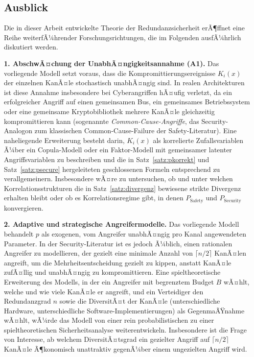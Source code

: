 ﻿\documentclass[a4paper,12pt]{article}
\theoremstyle{definition}
\begin{document}
\subsection{Ausblick}

Die in dieser Arbeit entwickelte Theorie der Redundanzsicherheit erÃ¶ffnet eine Reihe weiterfÃ¼hrender Forschungsrichtungen, die im Folgenden ausfÃ¼hrlich diskutiert werden.

\textbf{1. AbschwÃ¤chung der UnabhÃ¤ngigkeitsannahme (A1).} Das vorliegende Modell setzt voraus, dass die Kompromittierungsereignisse $K_i(x)$ der einzelnen KanÃ¤le stochastisch unabhÃ¤ngig sind. In realen Architekturen ist diese Annahme insbesondere bei Cyberangriffen hÃ¤ufig verletzt, da ein erfolgreicher Angriff auf einen gemeinsamen Bus, ein gemeinsames Betriebssystem oder eine gemeinsame Kryptobibliothek mehrere KanÃ¤le gleichzeitig kompromittieren kann (sogenannte \emph{Common-Cause-Angriffe}, das Security-Analogon zum klassischen Common-Cause-Failure der Safety-Literatur). Eine naheliegende Erweiterung besteht darin, $K_i(x)$ als korrelierte Zufallsvariablen Ã¼ber ein Copula-Modell oder ein Faktor-Modell mit gemeinsamer latenter Angriffsvariablen zu beschreiben und die in Satz~\ref{satz:pkorrekt} und Satz~\ref{satz:psecure} hergeleiteten geschlossenen Formeln entsprechend zu verallgemeinern. Insbesondere wÃ¤re zu untersuchen, ob und unter welchen Korrelationsstrukturen die in Satz~\ref{satz:divergenz} bewiesene strikte Divergenz erhalten bleibt oder ob es Korrelationsregime gibt, in denen $P_{\mathrm{Safety}}$ und $P_{\mathrm{Security}}$ konvergieren.

\textbf{2. Adaptive und strategische Angreifermodelle.} Das vorliegende Modell behandelt $p$ als exogenen, vom Angreifer unabhÃ¤ngig pro Kanal angewendeten Parameter. In der Security-Literatur ist es jedoch Ã¼blich, einen rationalen Angreifer zu modellieren, der gezielt eine minimale Anzahl von $\lceil n/2 \rceil$ KanÃ¤len angreift, um die Mehrheitsentscheidung gezielt zu kippen, anstatt KanÃ¤le zufÃ¤llig und unabhÃ¤ngig zu kompromittieren. Eine spieltheoretische Erweiterung des Modells, in der ein Angreifer mit begrenztem Budget $B$ wÃ¤hlt, welche und wie viele KanÃ¤le er angreift, und ein Verteidiger den Redundanzgrad $n$ sowie die DiversitÃ¤t der KanÃ¤le (unterschiedliche Hardware, unterschiedliche Software-Implementierungen) als GegenmaÃŸnahme wÃ¤hlt, wÃ¼rde das Modell von einer rein probabilistischen zu einer spieltheoretischen Sicherheitsanalyse weiterentwickeln. Insbesondere ist die Frage von Interesse, ab welchem DiversitÃ¤tsgrad ein gezielter Angriff auf $\lceil n/2\rceil$ KanÃ¤le Ã¶konomisch unattraktiv gegenÃ¼ber einem ungezielten Angriff wird.
\end{document}
